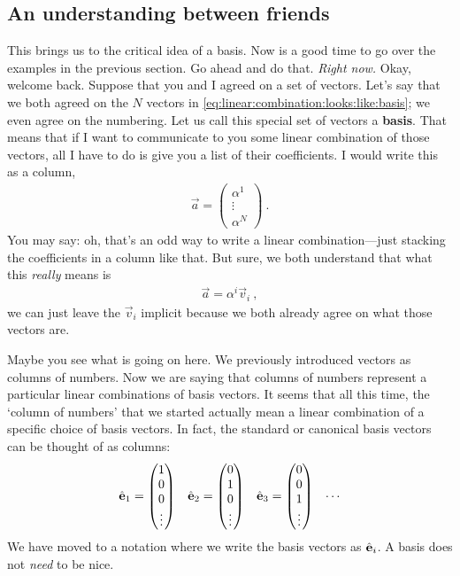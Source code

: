\subsection{An understanding between friends}
This brings us to the critical idea of a basis. Now is a good time to go over the examples in the previous section. Go ahead and do that. \emph{Right now.} Okay, welcome back. Suppose that you and I agreed on a set of vectors. Let's say that we both agreed on the $N$ vectors in \eqref{eq:linear:combination:looks:like:basis}; we even agree on the numbering. Let us call this special set of vectors a \textbf{basis}. That means that if I want to communicate to you some linear combination of those vectors, all I have to do is give you a list of their coefficients. I would write this as a column,
\begin{align}
    \vec{a} = 
    \begin{pmatrix}
        \alpha^1\\
        \vdots \\
        \alpha ^N
    \end{pmatrix} \ .
\end{align}
You may say: oh, that's an odd way to write a linear combination---just stacking the coefficients in a column like that. But sure, we both understand that what this \emph{really} means is
\begin{align}
    \vec{a} = 
    \alpha^i \vec{v}_i \ ,
\end{align}
we can just leave the $\vec{v}_i$ implicit because we both already agree on what those vectors are. 

Maybe you see what is going on here. We previously introduced vectors as columns of numbers. Now we are saying that columns of numbers represent a particular linear combinations of basis vectors. It seems that all this time, the `column of numbers' that we started actually mean a linear combination of a specific choice of basis vectors. In fact, the standard or canonical basis vectors can be thought of as columns:
\begin{align}
    \hat{\mathbf{e}}_1 &= 
    \begin{pmatrix}
        1\\ 0 \\  0 \\\vdots
    \end{pmatrix}
    &
    \hat{\mathbf{e}}_2 &= 
    \begin{pmatrix}
        0 \\ 1 \\  0 \\\vdots
    \end{pmatrix}
    &
    \hat{\mathbf{e}}_3 &= 
    \begin{pmatrix}
        0 \\ 0 \\  1 \\\vdots
    \end{pmatrix}
    &
    \cdots
    \label{eq:canonical:basis}
\end{align}
We have moved to a notation where we write the basis vectors as $\hat{\mathbf{e}}_i$. A basis does not \emph{need} to be nice. 


